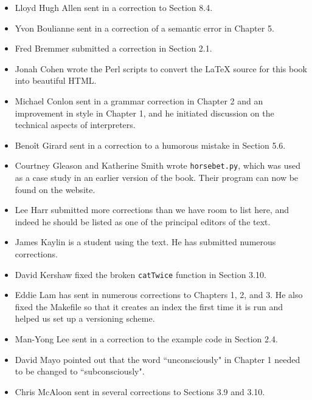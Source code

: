 \documentclass[10pt]{book}
\begin{document}
\begin{itemize}

\small
\item Lloyd Hugh Allen sent in a correction to Section 8.4.

\item Yvon Boulianne sent in a correction of a semantic error in
Chapter 5.

\item Fred Bremmer submitted a correction in Section 2.1.

\item Jonah Cohen wrote the Perl scripts to convert the
LaTeX source for this book into beautiful HTML.

\item Michael Conlon sent in a grammar correction in Chapter 2
and an improvement in style in Chapter 1, and he initiated discussion
on the technical aspects of interpreters.

\item Beno\^{i}t Girard sent in a
correction to a humorous mistake in Section 5.6.

\item Courtney Gleason and Katherine Smith wrote {\tt horsebet.py},
which was used as a case study in an earlier version of the book.  Their
program can now be found on the website.

\item Lee Harr submitted more corrections than we have room to list
here, and indeed he should be listed as one of the principal editors
of the text.

\item James Kaylin is a student using the text. He has submitted
numerous corrections.

\item David Kershaw fixed the broken {\tt catTwice} function in Section
3.10.

\item Eddie Lam has sent in numerous corrections to Chapters
1, 2, and 3.
He also fixed the Makefile so that it creates an index the first time it is
run and helped us set up a versioning scheme.

\item Man-Yong Lee sent in a correction to the example code in
Section 2.4.

\item David Mayo pointed out that the word ``unconsciously"
in Chapter 1 needed
to be changed to ``subconsciously".

\item Chris McAloon sent in several corrections to Sections 3.9 and
3.10.


\end{itemize}
\end{document}
